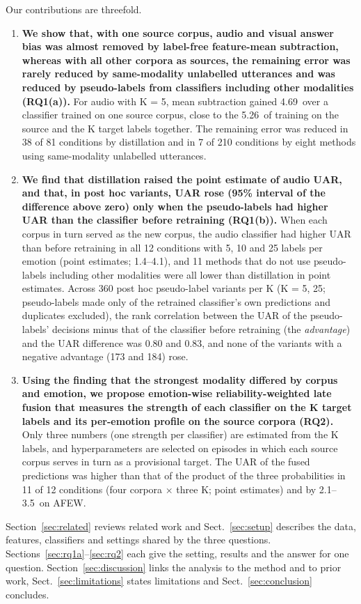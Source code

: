 Our contributions are threefold.
\begin{enumerate}
\item \textbf{We show that, with one source corpus, audio and visual answer bias was almost removed by label-free feature-mean subtraction, whereas with all other corpora as sources, the remaining error was rarely reduced by same-modality unlabelled utterances and was reduced by pseudo-labels from classifiers including other modalities (RQ1(a)).} For audio with K = 5, mean subtraction gained 4.69\pt\ over a classifier trained on one source corpus, close to the 5.26\pt\ of training on the source and the K target labels together. The remaining error was reduced in 38 of 81 conditions by distillation and in 7 of 210 conditions by eight methods using same-modality unlabelled utterances.
\item \textbf{We find that distillation raised the point estimate of audio UAR, and that, in post hoc variants, UAR rose (95\% interval of the difference above zero) only when the pseudo-labels had higher UAR than the classifier before retraining (RQ1(b)).} When each corpus in turn served as the new corpus, the audio classifier had higher UAR than before retraining in all 12 conditions with 5, 10 and 25 labels per emotion (point estimates; 1.4--4.1\pt), and 11 methods that do not use pseudo-labels including other modalities were all lower than distillation in point estimates. Across 360 post hoc pseudo-label variants per K (K = 5, 25; pseudo-labels made only of the retrained classifier's own predictions and duplicates excluded), the rank correlation between the UAR of the pseudo-labels' decisions minus that of the classifier before retraining (the \emph{advantage}) and the UAR difference was 0.80 and 0.83, and none of the variants with a negative advantage (173 and 184) rose.
\item \textbf{Using the finding that the strongest modality differed by corpus and emotion, we propose emotion-wise reliability-weighted late fusion that measures the strength of each classifier on the K target labels and its per-emotion profile on the source corpora (RQ2).} Only three numbers (one strength per classifier) are estimated from the K labels, and hyperparameters are selected on episodes in which each source corpus serves in turn as a provisional target. The UAR of the fused predictions was higher than that of the product of the three probabilities in 11 of 12 conditions (four corpora $\times$ three K; point estimates) and by 2.1--3.5\pt\ on AFEW.
\end{enumerate}

Section~\ref{sec:related} reviews related work and Sect.~\ref{sec:setup} describes the data, features, classifiers and settings shared by the three questions. Sections~\ref{sec:rq1a}--\ref{sec:rq2} each give the setting, results and the answer for one question. Section~\ref{sec:discussion} links the analysis to the method and to prior work, Sect.~\ref{sec:limitations} states limitations and Sect.~\ref{sec:conclusion} concludes.
